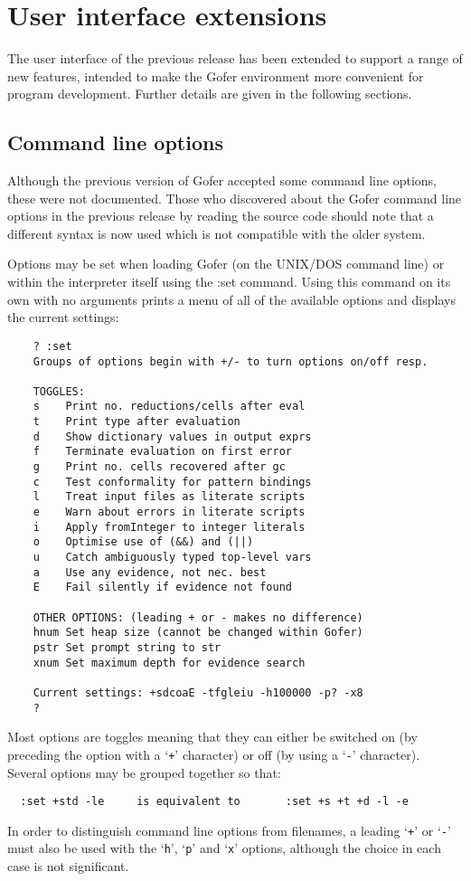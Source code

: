 \section{User interface extensions}

The user interface of the previous release has been extended to support
a range of new features, intended to make the Gofer environment more
convenient for program development.  Further details are given in the
following sections.

\subsection{Command line options}
Although the previous version of Gofer accepted some command line
options, these were not documented.  Those who discovered about the
Gofer command line options in the previous release by reading the
source code should note that a different syntax is now used which is
not compatible with the older system.

Options may be set when loading Gofer (on the UNIX/DOS command line)
or within the interpreter itself using the :set command.  Using this
command on its own with no arguments prints a menu of all of the
available options and displays the current settings:
\begin{verbatim}
    ? :set
    Groups of options begin with +/- to turn options on/off resp.
 
    TOGGLES:
    s    Print no. reductions/cells after eval
    t    Print type after evaluation
    d    Show dictionary values in output exprs
    f    Terminate evaluation on first error
    g    Print no. cells recovered after gc
    c    Test conformality for pattern bindings
    l    Treat input files as literate scripts
    e    Warn about errors in literate scripts
    i    Apply fromInteger to integer literals
    o    Optimise use of (&&) and (||)
    u    Catch ambiguously typed top-level vars
    a    Use any evidence, not nec. best
    E    Fail silently if evidence not found

    OTHER OPTIONS: (leading + or - makes no difference)
    hnum Set heap size (cannot be changed within Gofer)
    pstr Set prompt string to str
    xnum Set maximum depth for evidence search

    Current settings: +sdcoaE -tfgleiu -h100000 -p? -x8
    ?
\end{verbatim}
Most options are toggles meaning that they can either be switched on
(by preceding the option with a `\verb"+"' character) or off 
(by using a `\verb"-"'
character).  Several options may be grouped together so that:
\begin{verbatim}
  :set +std -le     is equivalent to       :set +s +t +d -l -e
\end{verbatim}
In order to distinguish command line options from filenames, a leading
`\verb"+"' or `\verb"-"' must also be used with the `\verb"h"', `\verb"p"' 
and `\verb"x"' options, although
the choice in each case is not significant.

